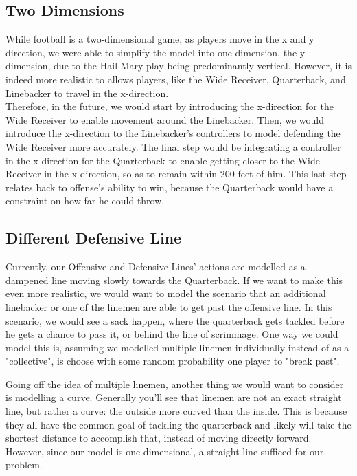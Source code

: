 \subsection{Two Dimensions}

\quad While football is a two-dimensional game, as players move in the x and y direction, we were able to simplify the model into one dimension, the y-dimension, due to the Hail Mary play being predominantly vertical. However, it is indeed more realistic to allows players, like the Wide Receiver, Quarterback, and Linebacker to travel in the x-direction. \\

Therefore, in the future, we would start by introducing the x-direction for the Wide Receiver to enable movement around the Linebacker. Then, we would introduce the x-direction to the Linebacker’s controllers to model defending the Wide Receiver more accurately. The final step would be integrating a controller in the x-direction for the Quarterback to enable getting closer to the Wide Receiver in the x-direction, so as to remain within 200 feet of him. This last step relates back to offense’s ability to win, because the Quarterback would have a constraint on how far he could throw.

\subsection{Different Defensive Line}

\quad Currently, our Offensive and Defensive Lines' actions are modelled as a dampened line moving slowly towards the Quarterback. If we want to make this even more realistic, we would want to model the scenario that an additional linebacker or one of the linemen are able to get past the offensive line. In this scenario, we would see a sack happen, where the quarterback gets tackled before he gets a chance to pass it, or behind the line of scrimmage. One way we could model this is, assuming we modelled multiple linemen individually instead of as a "collective", is choose with some random probability one player to "break past". 

Going off the idea of multiple linemen, another thing we would want to consider is modelling a curve. Generally you'll see that linemen are not an exact straight line, but rather a curve: the outside more curved than the inside. This is because they all have the common goal of tackling the quarterback and likely will take the shortest distance to accomplish that, instead of moving directly forward. However, since our model is one dimensional, a straight line sufficed for our problem.